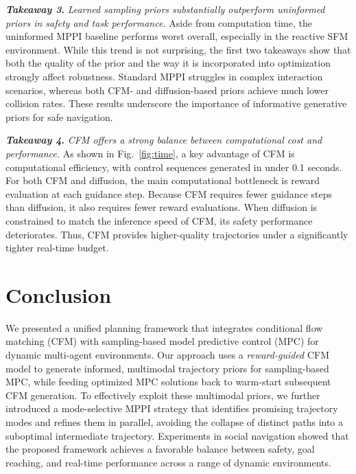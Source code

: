 \documentclass[letterpaper,10 pt,conference]{ieeeconf}
\begin{document}
\noindent\textbf{\textit{Takeaway 3}.}
\textit{Learned sampling priors substantially outperform uninformed priors in safety and task performance.}
Aside from computation time, the uninformed MPPI baseline performs worst overall, especially in the reactive SFM environment. 
While this trend is not surprising, the first two takeaways show that both the quality of the prior and the way it is incorporated into optimization strongly affect robustness. 
Standard MPPI struggles in complex interaction scenarios, whereas both CFM- and diffusion-based priors achieve much lower collision rates. 
These results underscore the importance of informative generative priors for safe navigation.

\noindent\textbf{\textit{Takeaway 4}.}
\textit{CFM offers a strong balance between computational cost and performance.}
As shown in Fig.~\ref{fig:time}, a key advantage of CFM is computational efficiency, with control sequences generated in under 0.1 seconds.
For both CFM and diffusion, the main computational bottleneck is reward evaluation at each guidance step.
Because CFM requires fewer guidance steps than diffusion, it also requires fewer reward evaluations. 
When diffusion is constrained to match the inference speed of CFM, its safety performance deteriorates. 
Thus, CFM provides higher-quality trajectories under a significantly tighter real-time budget.

\section{Conclusion} \label{sec:conclusion}
We presented a unified planning framework that integrates conditional flow matching (CFM) with sampling-based model predictive control (MPC) for dynamic multi-agent environments. 
Our approach uses a \textit{reward-guided} CFM model to generate informed, multimodal trajectory priors for sampling-based MPC, while feeding optimized MPC solutions back to warm-start subsequent CFM generation.
To effectively exploit these multimodal priors, we further introduced a mode-selective MPPI strategy that identifies promising trajectory modes and refines them in parallel, avoiding the collapse of distinct paths into a suboptimal intermediate trajectory. 
Experiments in social navigation showed that the proposed framework achieves a favorable balance between safety, goal reaching, and real-time performance across a range of dynamic environments.




\end{document}
